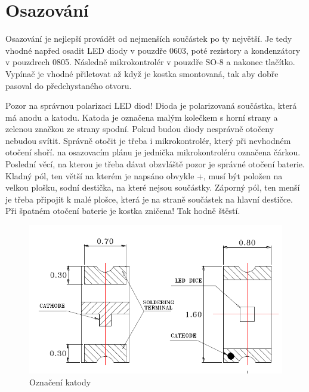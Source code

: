 \section*{Osazování}

Osazování je nejlepší provádět od nejmenších součástek po ty největší. Je tedy vhodné napřed osadit LED diody v pouzdře 0603, poté rezistory a kondenzátory v pouzdrech 0805. Následně mikrokontrolér v pouzdře SO-8 a nakonec tlačítko. Vypínač je vhodné přiletovat až když je kostka smontovaná, tak aby dobře pasoval do předchystaného otvoru.

Pozor na správnou polarizaci LED diod! Dioda je polarizovaná součástka, která má anodu a katodu. Katoda je označena malým kolečkem s horní strany a zelenou značkou ze strany spodní. Pokud budou diody nesprávně otočeny nebudou svítit. Správně otočit je třeba i mikrokontrolér, který při nevhodném otočení shoří. na osazovacím plánu je jednička mikrokontroléru označena čárkou. Poslední věcí, na kterou je třeba dávat obzvláště pozor je správné otočení baterie. Kladný pól, ten větší na kterém je napsáno obvykle +, musí být položen na velkou plošku, sodní destička, na které nejsou součástky. Záporný pól, ten menší je třeba připojit k malé plošce, která je na straně součástek na hlavní destičce. Při špatném otočení baterie je kostka zničena! Tak hodně štěstí.

\begin{figure}[H]
  \centering
  \includegraphics[width=\textwidth]{../img/LED.pdf}
  \caption{Označení katody}
  \label{img:1}
\end{figure}